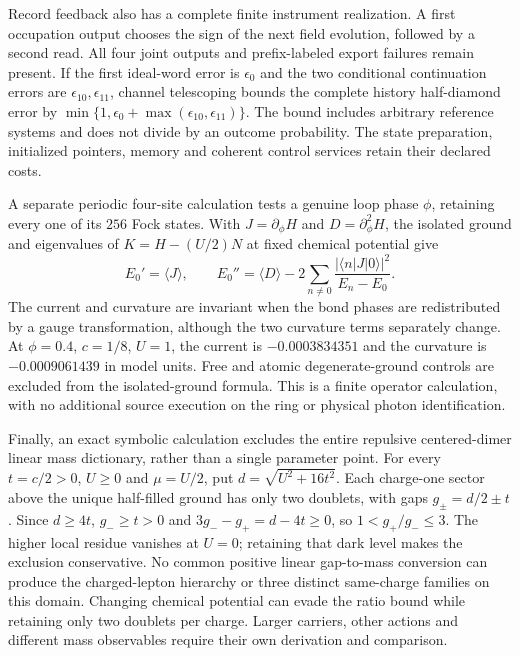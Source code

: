 Record feedback also has a complete finite instrument realization.
A first occupation output chooses the sign of the next field evolution,
followed by a second read. All four joint outputs and prefix-labeled
export failures remain present. If the first ideal-word error is
$\epsilon_0$ and the two conditional continuation errors are
$\epsilon_{10},\epsilon_{11}$, channel telescoping bounds the complete
history half-diamond error by
$\min\{1,\epsilon_0+\max(\epsilon_{10},\epsilon_{11})\}$.
The bound includes arbitrary reference systems and does not divide by
an outcome probability. The state preparation, initialized pointers,
memory and coherent control services retain their declared costs.

A separate periodic four-site calculation tests a genuine loop phase
$\phi$, retaining every one of its $256$ Fock states. With
$J=\partial_\phi H$ and $D=\partial_\phi^2H$, the isolated ground
and eigenvalues of $K=H-(U/2)N$ at fixed chemical potential give
\[
 E_0'=\langle J\rangle,\qquad
 E_0''=\langle D\rangle-
 2\sum_{n\ne0}\frac{|\langle n|J|0\rangle|^2}{E_n-E_0}.
\]
The current and curvature are invariant when the bond phases are
redistributed by a gauge transformation, although the two curvature
terms separately change. At $\phi=0.4$, $c=1/8$, $U=1$, the current is
$-0.0003834351$ and the curvature is $-0.0009061439$ in model units.
Free and atomic degenerate-ground controls are excluded from the
isolated-ground formula. This is a finite operator calculation, with no
additional source execution on the ring or physical photon identification.

Finally, an exact symbolic calculation excludes the entire repulsive
centered-dimer linear mass dictionary, rather than a single parameter
point. For every $t=c/2>0$, $U\ge0$ and $\mu=U/2$, put
$d=\sqrt{U^2+16t^2}$. Each charge-one sector above the unique
half-filled ground has only two doublets, with gaps $g_\pm=d/2\pm t$.
Since $d\ge4t$, $g_-\ge t>0$ and $3g_--g_+=d-4t\ge0$, so
$1<g_+/g_-\le3$. The higher local residue vanishes at $U=0$;
retaining that dark level makes the exclusion conservative. No common
positive linear gap-to-mass conversion can produce the charged-lepton
hierarchy or three distinct same-charge families on this domain.
Changing chemical potential can evade the ratio bound while retaining
only two doublets per charge. Larger carriers, other actions and
different mass observables require their own derivation and comparison.
